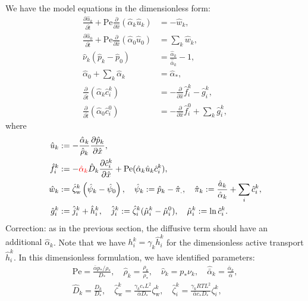 \documentclass{article}
\begin{document}
We have the model equations in the dimensionless form:
\begin{align}
    \frac{\partial \hat{\alpha}_k}{\partial \hat{t}}  + \mathrm{Pe}\frac{\partial}{\partial \hat{x}}\left( \hat{\alpha}_k \hat{u}_k \right) &= - \hat{w}_k,\\ \label{eq:nd_1steq}
    \frac{\partial\hat{\alpha}_0}{\partial \hat{t}}+\mathrm{Pe}\frac{\partial}{\partial \hat{x}}\left( \hat{\alpha}_0 \hat{u}_0 \right) &=\sum_k \hat{w}_k,\\
    \hat{\nu}_k\left( \hat{p}_k - \hat{p}_0 \right) &= \frac{\hat{\alpha}_k}{\hat{\bar{\alpha}}_k}-1,\\
    \hat{\alpha}_0 + \sum_{k} \hat{\alpha}_k &= \hat{\alpha}_*,\\
    \frac{\partial}{\partial \hat{t}}\left( \hat{\alpha}_k \hat{c}_i^k \right)&=-\frac{\partial}{\partial \hat{x}} \hat{f}_i^k - \hat{g}_i^k,\\
    \frac{\partial}{\partial \hat{t}}\left( \hat{\alpha}_0 \hat{c}_i^0 \right)&=-\frac{\partial}{\partial \hat{x}} \hat{f}_i^0 + \sum_k \hat{g}_i^k,
\end{align}
    where
\begin{align}
    \hat{u}_k &:= -\frac{\hat{\alpha}_k}{\hat{\rho}_k}\frac{\partial \hat{p}_k}{\partial \hat{x}},\\
    \hat{f}_i^k &:= -{\color{red}\hat{\alpha}_k}\hat{D}_k \frac{\partial \hat{c}_i^k}{\partial \hat{x}} + \mathrm{Pe}(\hat{\alpha}_k\hat{u}_k\hat{c}_i^k),\\
    \hat{w}_k&:= \hat{\zeta}_\mathrm{w}^k\left( \hat{\psi}_k-\hat{\psi}_0 \right),\quad\hat{\psi}_k := \hat{p}_k - \hat{\pi}_.,\quad \hat{\pi}_k := \frac{\hat{a}_k}{\hat{\alpha}_k}+\sum_i \hat{c}_i^k,\\
    \hat{g}_i^k &:= \hat{j}_i^k+\hat{h}_i^k,\quad \hat{j}_i^k :=\hat{\zeta}_i^k(\hat{\mu}_i^k-\hat{\mu}_i^0),\quad \hat{\mu}_i^k:=\ln \hat{c}_i^k.\label{eq:nd_lasteq}
\end{align}
{\color{red}Correction: as in the previous section, the diffusive term should have an additional $\hat{\alpha}_k$}.
Note that we have $h_i^k = \gamma_k\hat{h}_i^k$ for the dimensionless active transport $\hat{h}_i^k$.
In this dimensionless formulation, we have identified parameters:
\begin{gather}
    \mathrm{Pe} = \frac{\bar{\alpha}p_*/\rho_*}{D_*},\quad \hat{\rho}_k = \frac{\rho_k}{\rho_*},\quad \hat{\nu}_k = p_*\nu_k,\quad \hat{\bar{\alpha}}_k = \frac{\bar{\alpha}_k}{\bar{\alpha}},\\
    \hat{D}_k = \frac{D_k}{D_*},\quad \hat{\zeta}_\mathrm{w}^k = \frac{\gamma_k c_*L^2}{\bar{\alpha}D_*}\zeta_\mathrm{w}^k,\quad\hat{\zeta}_i^k = \frac{\gamma_kRT L^2}{\bar{\alpha}c_* D_*}\zeta_i^k,
\end{gather}
\end{document}
